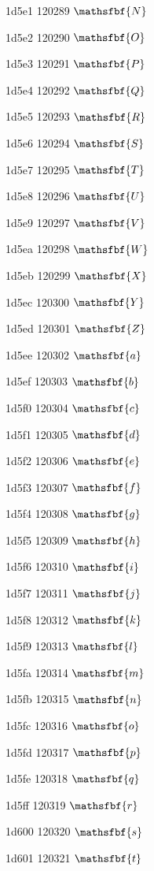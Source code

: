 \documentclass[11pt]{article}
\begin{document}
1d5e1 120289 \ensuremath{\mathsfbf{N}}

1d5e2 120290 \ensuremath{\mathsfbf{O}}

1d5e3 120291 \ensuremath{\mathsfbf{P}}

1d5e4 120292 \ensuremath{\mathsfbf{Q}}

1d5e5 120293 \ensuremath{\mathsfbf{R}}

1d5e6 120294 \ensuremath{\mathsfbf{S}}

1d5e7 120295 \ensuremath{\mathsfbf{T}}

1d5e8 120296 \ensuremath{\mathsfbf{U}}

1d5e9 120297 \ensuremath{\mathsfbf{V}}

1d5ea 120298 \ensuremath{\mathsfbf{W}}

1d5eb 120299 \ensuremath{\mathsfbf{X}}

1d5ec 120300 \ensuremath{\mathsfbf{Y}}

1d5ed 120301 \ensuremath{\mathsfbf{Z}}

1d5ee 120302 \ensuremath{\mathsfbf{a}}

1d5ef 120303 \ensuremath{\mathsfbf{b}}

1d5f0 120304 \ensuremath{\mathsfbf{c}}

1d5f1 120305 \ensuremath{\mathsfbf{d}}

1d5f2 120306 \ensuremath{\mathsfbf{e}}

1d5f3 120307 \ensuremath{\mathsfbf{f}}

1d5f4 120308 \ensuremath{\mathsfbf{g}}

1d5f5 120309 \ensuremath{\mathsfbf{h}}

1d5f6 120310 \ensuremath{\mathsfbf{i}}

1d5f7 120311 \ensuremath{\mathsfbf{j}}

1d5f8 120312 \ensuremath{\mathsfbf{k}}

1d5f9 120313 \ensuremath{\mathsfbf{l}}

1d5fa 120314 \ensuremath{\mathsfbf{m}}

1d5fb 120315 \ensuremath{\mathsfbf{n}}

1d5fc 120316 \ensuremath{\mathsfbf{o}}

1d5fd 120317 \ensuremath{\mathsfbf{p}}

1d5fe 120318 \ensuremath{\mathsfbf{q}}

1d5ff 120319 \ensuremath{\mathsfbf{r}}

1d600 120320 \ensuremath{\mathsfbf{s}}

1d601 120321 \ensuremath{\mathsfbf{t}}
\end{document}
